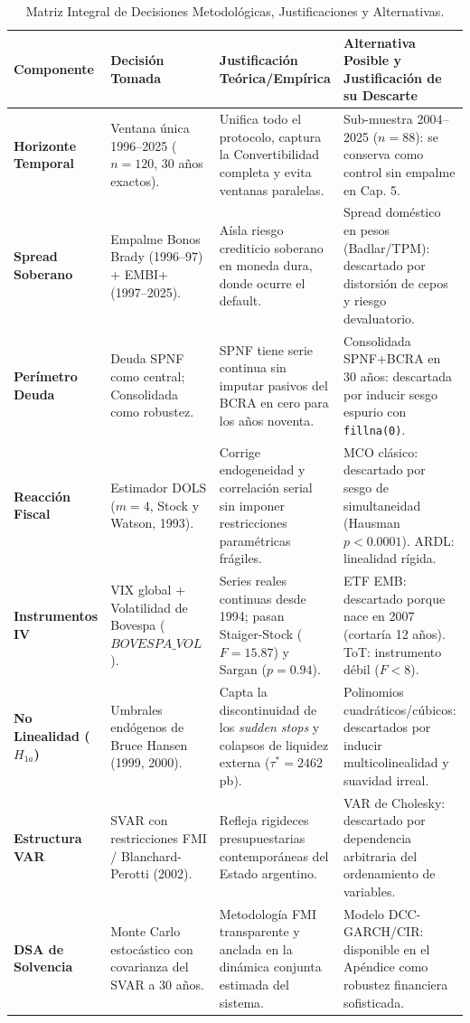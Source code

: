 \documentclass[11pt,a4paper]{article}
\begin{document}
\begin{table}[htbp]
\centering
\footnotesize
\renewcommand{\arraystretch}{1.25}
\begin{tabularx}{\textwidth}{p{2.2cm} p{3.8cm} p{4.2cm} X}
\toprule
\textbf{Componente} & \textbf{Decisión Tomada} & \textbf{Justificación Teórica/Empírica} & \textbf{Alternativa Posible y Justificación de su Descarte} \\
\midrule
\textbf{Horizonte Temporal} & Ventana única 1996--2025 ($n=120$, 30 años exactos). & Unifica todo el protocolo, captura la Convertibilidad completa y evita ventanas paralelas. & Sub-muestra 2004--2025 ($n=88$): se conserva como control sin empalme en Cap. 5. \\
\textbf{Spread Soberano} & Empalme Bonos Brady (1996--97) + EMBI+ (1997--2025). & Aísla riesgo crediticio soberano en moneda dura, donde ocurre el default. & Spread doméstico en pesos (Badlar/TPM): descartado por distorsión de cepos y riesgo devaluatorio. \\
\textbf{Perímetro Deuda} & Deuda SPNF como central; Consolidada como robustez. & SPNF tiene serie continua sin imputar pasivos del BCRA en cero para los años noventa. & Consolidada SPNF+BCRA en 30 años: descartada por inducir sesgo espurio con \texttt{fillna(0)}. \\
\textbf{Reacción Fiscal} & Estimador DOLS ($m=4$, Stock y Watson, 1993). & Corrige endogeneidad y correlación serial sin imponer restricciones paramétricas frágiles. & MCO clásico: descartado por sesgo de simultaneidad (Hausman $p<0.0001$). ARDL: linealidad rígida. \\
\textbf{Instrumentos IV} & VIX global + Volatilidad de Bovespa ($BOVESPA\_VOL$). & Series reales continuas desde 1994; pasan Staiger-Stock ($F=15.87$) y Sargan ($p=0.94$). & ETF EMB: descartado porque nace en 2007 (cortaría 12 años). ToT: instrumento débil ($F<8$). \\
\textbf{No Linealidad ($H_{1a}$)} & Umbrales endógenos de Bruce Hansen (1999, 2000). & Capta la discontinuidad de los \textit{sudden stops} y colapsos de liquidez externa ($\tau^*=2462$ pb). & Polinomios cuadráticos/cúbicos: descartados por inducir multicolinealidad y suavidad irreal. \\
\textbf{Estructura VAR} & SVAR con restricciones FMI / Blanchard-Perotti (2002). & Refleja rigideces presupuestarias contemporáneas del Estado argentino. & VAR de Cholesky: descartado por dependencia arbitraria del ordenamiento de variables. \\
\textbf{DSA de Solvencia} & Monte Carlo estocástico con covarianza del SVAR a 30 años. & Metodología FMI transparente y anclada en la dinámica conjunta estimada del sistema. & Modelo DCC-GARCH/CIR: disponible en el Apéndice como robustez financiera sofisticada. \\
\bottomrule
\end{tabularx}
\caption{Matriz Integral de Decisiones Metodológicas, Justificaciones y Alternativas.}
\label{tab:matriz_maestra}
\end{table}
\end{document}
